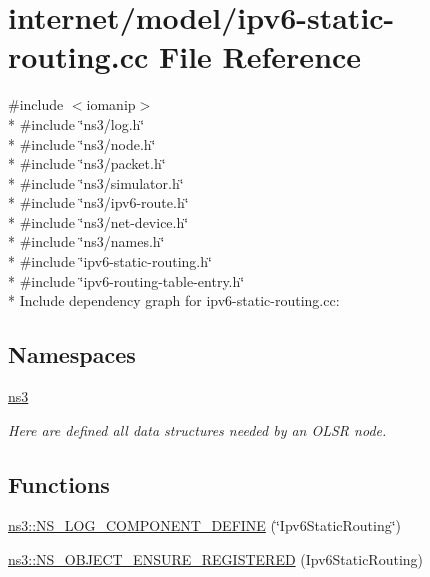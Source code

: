 \hypertarget{ipv6-static-routing_8cc}{}\section{internet/model/ipv6-\/static-\/routing.cc File Reference}
\label{ipv6-static-routing_8cc}
{\ttfamily \#include $<$iomanip$>$}\\*
{\ttfamily \#include \char`\"{}ns3/log.\+h\char`\"{}}\\*
{\ttfamily \#include \char`\"{}ns3/node.\+h\char`\"{}}\\*
{\ttfamily \#include \char`\"{}ns3/packet.\+h\char`\"{}}\\*
{\ttfamily \#include \char`\"{}ns3/simulator.\+h\char`\"{}}\\*
{\ttfamily \#include \char`\"{}ns3/ipv6-\/route.\+h\char`\"{}}\\*
{\ttfamily \#include \char`\"{}ns3/net-\/device.\+h\char`\"{}}\\*
{\ttfamily \#include \char`\"{}ns3/names.\+h\char`\"{}}\\*
{\ttfamily \#include \char`\"{}ipv6-\/static-\/routing.\+h\char`\"{}}\\*
{\ttfamily \#include \char`\"{}ipv6-\/routing-\/table-\/entry.\+h\char`\"{}}\\*
Include dependency graph for ipv6-\/static-\/routing.cc\+:
\subsection*{Namespaces}
\begin{DoxyCompactItemize}
\item 
 \hyperlink{namespacens3}{ns3}
\begin{DoxyCompactList}\small\item\em Here are defined all data structures needed by an O\+L\+SR node. \end{DoxyCompactList}\end{DoxyCompactItemize}
\subsection*{Functions}
\begin{DoxyCompactItemize}
\item 
\hyperlink{namespacens3_a2fa5eee93507938528378b6444de05da}{ns3\+::\+N\+S\+\_\+\+L\+O\+G\+\_\+\+C\+O\+M\+P\+O\+N\+E\+N\+T\+\_\+\+D\+E\+F\+I\+NE} (\char`\"{}Ipv6\+Static\+Routing\char`\"{})
\item 
\hyperlink{namespacens3_a920230f3111b44d6c8770f70b05d507e}{ns3\+::\+N\+S\+\_\+\+O\+B\+J\+E\+C\+T\+\_\+\+E\+N\+S\+U\+R\+E\+\_\+\+R\+E\+G\+I\+S\+T\+E\+R\+ED} (Ipv6\+Static\+Routing)
\end{DoxyCompactItemize}
